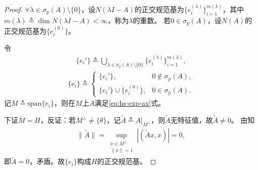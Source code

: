 \documentclass[../../main.tex]{subfiles}%
\begin{document}
\begin{proof}

$\forall\lambda\in\sigma_p(A)\setminus\{0\}$，设$N(\lambda I-A)$的正交规范基为$\{e_i^{(\lambda)}\}_{i=1}^{m(\lambda)}$，其中$m(\lambda)\triangleq\dim N(\lambda I-A)<\infty$，称为$\lambda$的重数。
若$0\in\sigma_p(A)$，设$N(A)$的正交规范基为$\{e_i^{(0)}\}$。

令
\begin{align*}
\{e_i'\}\triangleq\bigcup\limits_{\lambda\in\sigma_p(A)\setminus\{0\}}\{e_i^{(\lambda)}\}_{i=1}^{m(\lambda)},
\end{align*}
\begin{align*}
\{e_i\}\triangleq
\begin{cases}
\{e_i'\},&0\notin\sigma_p(A),\\
\{e_i'\}\cup\{e_i^{(0)}\},&0\in\sigma_p(A).
\end{cases}
\end{align*}
记$M\triangleq\mathrm{span}\{e_i\}$，则在$M$上$A$满足\eqref{eq:hs-exp-ax}式。

下证$\overline{M}=H$，反证：若$M^\perp\neq\{\theta\}$，记$\widetilde{A}\triangleq A|_{M^\perp}$，则$\widetilde{A}$无特征值，故$\widetilde{A}\neq0$。
由知
\begin{align*}
\|\widetilde{A}\|=\sup_{\substack{x\in M^\perp\\\|x\|=1}}|(\widetilde{A}x,x)|=0,
\end{align*}
即$\widetilde{A}=0$，矛盾。故$\{e_i\}$构成$H$的正交规范基。

\end{proof}
\end{document}
